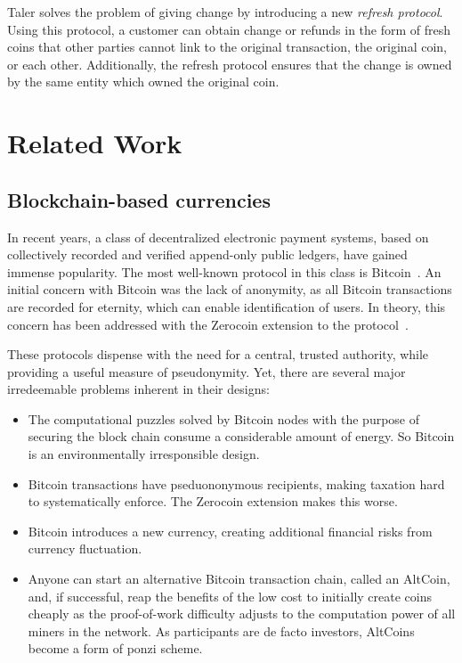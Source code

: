 \documentclass{llncs}
\begin{document}
Taler solves the problem of giving change by introducing a new
{\em refresh protocol}.  Using this protocol, a customer can obtain
change or refunds in the form of fresh coins that other parties cannot
link to the original transaction, the original coin, or each other.
Additionally, the refresh protocol ensures that the change is owned by
the same entity which owned the original coin.


\section{Related Work}

\subsection{Blockchain-based currencies}

In recent years, a class of decentralized electronic payment systems,
based on collectively recorded and verified append-only public
ledgers, have gained immense popularity.  The most well-known protocol
in this class is Bitcoin~\cite{nakamoto2008bitcoin}.  An initial
concern with Bitcoin was the lack of anonymity, as all Bitcoin
transactions are recorded for eternity, which can enable
identification of users.  In theory, this concern has been addressed
with the Zerocoin extension to the protocol~\cite{miers2013zerocoin}.

These protocols dispense with the need for a central, trusted
authority, while providing a useful measure of pseudonymity.
Yet, there are several major irredeemable problems inherent in their designs:

\begin{itemize}
  \item The computational puzzles solved by Bitcoin nodes with the purpose
    of securing the block chain consume a considerable amount of energy.
    So Bitcoin is an environmentally irresponsible design.
  \item Bitcoin transactions have pseduononymous recipients, making taxation
    hard to systematically enforce.
    The Zerocoin extension makes this worse.
  \item Bitcoin introduces a new currency, creating additional
    financial risks from currency fluctuation.
  \item Anyone can start an alternative Bitcoin transaction chain,
    called an AltCoin, and, if successful, reap the benefits of the low
    cost to initially create coins cheaply as the proof-of-work
    difficulty adjusts to the computation power of all
    miners in the network.  As participants are
    de facto investors, AltCoins become a form of ponzi scheme.
\end{itemize}
\end{document}
